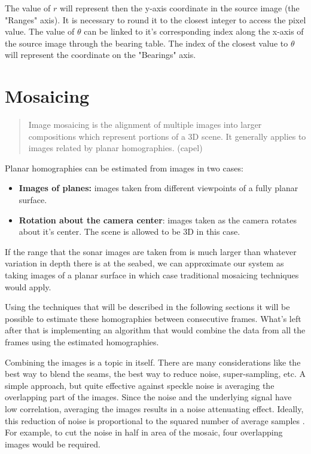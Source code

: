 The value of \(r\) will represent then the y-axis coordinate in the source image (the "Ranges" axis). It is necessary to round it to the closest integer to access the pixel value. The value of \(\theta\) can be linked to it's corresponding index along the x-axis of the source image through the bearing table. The index of the closest value to \(\theta\) will represent the coordinate on the "Bearings" axis.

\section{Mosaicing}


\begin{quote}
Image mosaicing is the alignment of multiple images into larger compositions which represent portions of a 3D scene. It generally applies to images related by planar homographies. (capel)
\end{quote}
Planar homographies can be estimated from images in two cases:
\begin{itemize}
    \item \textbf{Images of planes:} images taken from different viewpoints of a fully planar surface.
    \item \textbf{Rotation about the camera center}: images taken as the camera rotates about it's center. The scene is allowed to be 3D in this case.
\end{itemize}

If the range that the sonar images are taken from is much larger than whatever variation in depth there is at the seabed, we can approximate our system as taking images of a planar surface in which case traditional mosaicing techniques would apply. 

Using the techniques that will be described in the following sections it will be possible to estimate these homographies between consecutive frames. What's left after that is implementing an algorithm that would combine the data from all the frames using the estimated homographies.

Combining the images is a topic in itself. There are many considerations like the best way to blend the seams, the best way to reduce noise, super-sampling, etc. A simple approach, but quite effective against speckle noise is averaging the overlapping part of the images. Since the noise and the underlying signal have low correlation, averaging the images results in a noise attenuating effect. Ideally, this reduction of noise is proportional to the squared number of average samples \cite{Hurtos2015}. For example, to cut the noise in half in area of the mosaic, four overlapping images would be required. 

